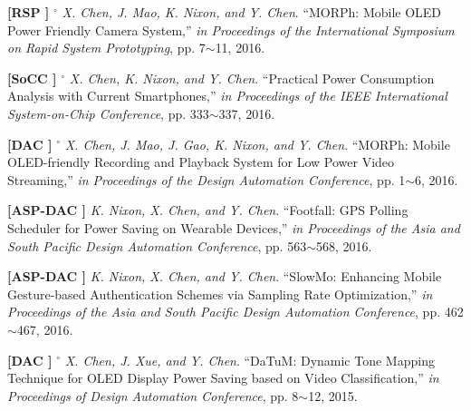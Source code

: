	\textbf{[RSP ]}
	$^\circ$
	\textsl{X. Chen, J. Mao, K. Nixon, and Y. Chen}.
		``MORPh\@: Mobile OLED Power Friendly Camera System,''
		\textsl{in Proceedings of the International Symposium on Rapid System Prototyping}, pp. 7$\sim$11, 2016.
			\vspace{-3mm}


	\textbf{[SoCC ]}
	$^\circ$
	\textsl{X. Chen, K. Nixon, and Y. Chen}.
		``Practical Power Consumption Analysis with Current Smartphones,''
		\textsl{in Proceedings of the IEEE International System-on-Chip Conference}, pp. 333$\sim$337, 2016.
			\vspace{-3mm}

	\textbf{[DAC ]}
	$^\circ$
	\textsl{X. Chen, J. Mao, J. Gao, K. Nixon, and Y. Chen}.
		``MORPh\@: Mobile OLED-friendly Recording and Playback System for Low Power Video Streaming,''
		\textsl{in Proceedings of the Design Automation Conference}, pp. 1$\sim$6, 2016.
			\vspace{-3mm}

	\textbf{[ASP-DAC ]}\hspace{2mm}
	\textsl{K. Nixon, X. Chen, and Y. Chen}.
		``Footfall\@: GPS Polling Scheduler for Power Saving on Wearable Devices,''
		\textsl{in Proceedings of the Asia and South Pacific Design Automation Conference}, pp. 563$\sim$568, 2016.
			\vspace{-3mm}

	\textbf{[ASP-DAC ]}\hspace{2mm}
	\textsl{K. Nixon, X. Chen, and Y. Chen}.
		``SlowMo\@: Enhancing Mobile Gesture-based Authentication Schemes via Sampling Rate Optimization,''
		\textsl{in Proceedings of the Asia and South Pacific Design Automation Conference}, pp. 462$\sim$467, 2016.
			\vspace{-3mm}

	\textbf{[DAC ]}
	$^\circ$
	\textsl{X. Chen, J. Xue, and Y. Chen}.
		``DaTuM\@: Dynamic Tone Mapping Technique for OLED Display Power Saving based on Video Classification,''
		\textsl{in Proceedings of Design Automation Conference}, pp. 8$\sim$12, 2015.
			\vspace{-3mm}

